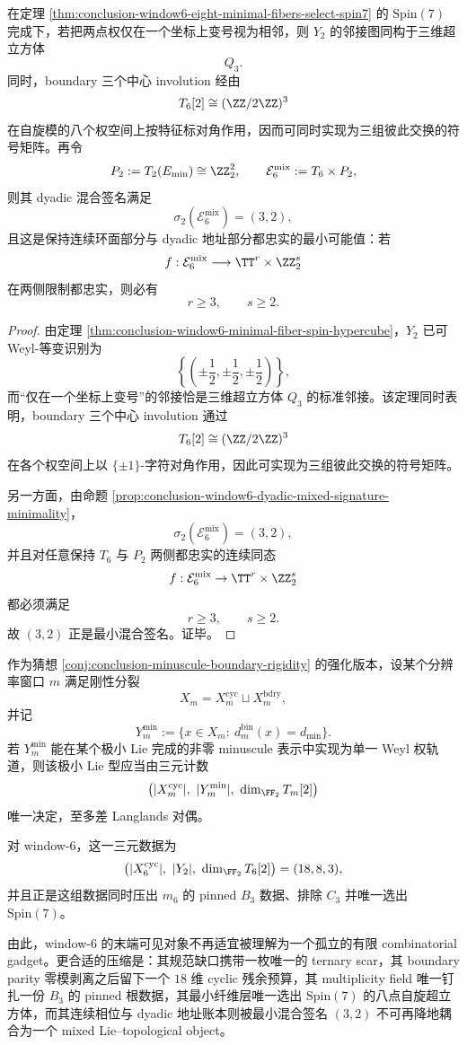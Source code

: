 \begin{theorem}\label{thm:conclusion-window6-spin-hypercube-boundary-torsion-mixed-signature}
在定理 \ref{thm:conclusion-window6-eight-minimal-fibers-select-spin7} 的 \(\mathrm{Spin}(7)\) 完成下，若把两点权仅在一个坐标上变号视为相邻，则 \(Y_2\) 的邻接图同构于三维超立方体
\[
Q_3.
\]
同时，boundary 三个中心 involution 经由
\[
T_6[2]\cong (\ZZ/2\ZZ)^3
\]
在自旋模的八个权空间上按特征标对角作用，因而可同时实现为三组彼此交换的符号矩阵。再令
\[
P_2:=T_2(E_{\min})\cong \ZZ_2^2,
\qquad
\mathcal E_6^{\mathrm{mix}}:=T_6\times P_2,
\]
则其 dyadic 混合签名满足
\[
\sigma_2(\mathcal E_6^{\mathrm{mix}})=(3,2),
\]
且这是保持连续环面部分与 dyadic 地址部分都忠实的最小可能值：若
\[
f:\mathcal E_6^{\mathrm{mix}}\longrightarrow \TT^r\times \ZZ_2^s
\]
在两侧限制都忠实，则必有
\[
r\ge 3,
\qquad
s\ge 2.
\]
\end{theorem}
\begin{proof}
由定理 \ref{thm:conclusion-window6-minimal-fiber-spin-hypercube}，\(Y_2\) 已可 Weyl-等变识别为
\[
\left\{
\left(\pm\frac12,\pm\frac12,\pm\frac12\right)
\right\},
\]
而“仅在一个坐标上变号”的邻接恰是三维超立方体 \(Q_3\) 的标准邻接。该定理同时表明，boundary 三个中心 involution 通过
\[
T_6[2]\cong (\ZZ/2\ZZ)^3
\]
在各个权空间上以 \(\{\pm1\}\)-字符对角作用，因此可实现为三组彼此交换的符号矩阵。

另一方面，由命题 \ref{prop:conclusion-window6-dyadic-mixed-signature-minimality}，
\[
\sigma_2(\mathcal E_6^{\mathrm{mix}})=(3,2),
\]
并且对任意保持 \(T_6\) 与 \(P_2\) 两侧都忠实的连续同态
\[
f:\mathcal E_6^{\mathrm{mix}}\to \TT^r\times \ZZ_2^s
\]
都必须满足
\[
r\ge 3,\qquad s\ge 2.
\]
故 \((3,2)\) 正是最小混合签名。证毕。
\end{proof}

\begin{conjecture}\label{conj:conclusion-window6-minuscule-boundary-rigidity-triple-count}
作为猜想 \ref{conj:conclusion-minuscule-boundary-rigidity} 的强化版本，设某个分辨率窗口 \(m\) 满足刚性分裂
\[
X_m=X_m^{\mathrm{cyc}}\sqcup X_m^{\mathrm{bdry}},
\]
并记
\[
Y_m^{\min}:=\{x\in X_m:\ d_m^{\mathrm{bin}}(x)=d_{\min}\}.
\]
若 \(Y_m^{\min}\) 能在某个极小 Lie 完成的非零 minuscule 表示中实现为单一 Weyl 权轨道，则该极小 Lie 型应当由三元计数
\[
\bigl(|X_m^{\mathrm{cyc}}|,\ |Y_m^{\min}|,\ \dim_{\FF_2}T_m[2]\bigr)
\]
唯一决定，至多差 Langlands 对偶。

对 window-\(6\)，这一三元数据为
\[
\bigl(|X_6^{\mathrm{cyc}}|,\ |Y_2|,\ \dim_{\FF_2}T_6[2]\bigr)=(18,8,3),
\]
并且正是这组数据同时压出 \(m_6\) 的 pinned \(B_3\) 数据、排除 \(C_3\) 并唯一选出 \(\mathrm{Spin}(7)\)。
\end{conjecture}

\noindent
由此，window-\(6\) 的末端可见对象不再适宜被理解为一个孤立的有限 combinatorial gadget。更合适的压缩是：其规范缺口携带一枚唯一的 ternary scar，其 boundary parity 零模剥离之后留下一个 \(18\) 维 cyclic 残余预算，其 multiplicity field 唯一钉扎一份 \(B_3\) 的 pinned 根数据，其最小纤维层唯一选出 \(\mathrm{Spin}(7)\) 的八点自旋超立方体，而其连续相位与 dyadic 地址账本则被最小混合签名 \((3,2)\) 不可再降地耦合为一个 mixed Lie--topological object。

\endinput
